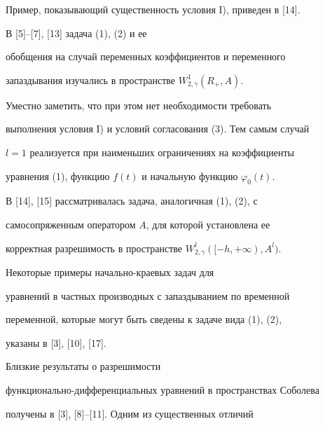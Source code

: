 \begin{note}


Пример, показывающий существенность условия I), приведен в [14].


\end{note}





\begin{note}


В [5]--[7], [13] задача (1), (2) и ее


обобщения на случай переменных коэффициентов и переменного


запаздывания изучались в пространстве $W^1_{2,\gamma }(R_+,A)$.


Уместно заметить, что при этом нет необходимости требовать


выполнения условия I) и условий согласования (3). Тем самым случай


$l=1$ реализуется при наименьших ограничениях на коэффициенты


уравнения (1), функцию $f(t)$ и начальную функцию $\varphi_0(t)$.





В [14], [15] рассматривалась задача, аналогичная (1), (2), с


самосопряженным оператором $A$, для которой установлена ее


корректная разрешимость в пространстве $W^l_{2,\gamma}([-h,+\infty),A^l)$.


\end{note}





\begin{note}


Некоторые примеры начально-краевых задач для


уравнений в частных производных с запаздыванием по временной


переменной, которые могут быть сведены к задаче вида (1), (2),


указаны в [3], [10], [17].


\end{note}





Близкие результаты о разрешимости


функционально-дифференциальных уравнений в пространствах Соболева


получены в [3], [8]--[11]. Одним из существенных отличий


